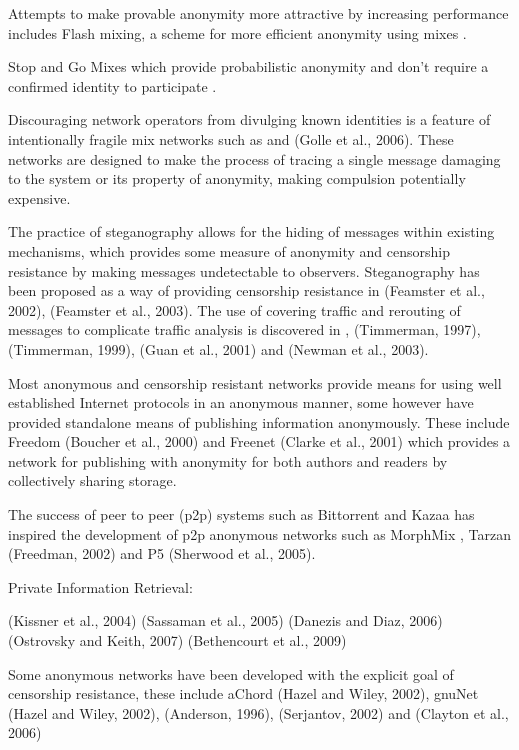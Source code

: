 \documentclass{ecuthesis}
\begin{document}
Attempts to make provable anonymity more attractive by increasing performance includes Flash mixing, a scheme for more efficient anonymity using mixes \citep{Jakobsson:1999p2008}.

Stop and Go Mixes which provide probabilistic anonymity and don’t require a confirmed identity to participate \citep{Kesdogan:1998p2027}.

Discouraging network operators from divulging known identities is a feature of intentionally fragile mix networks such as \citep{Reiter:2004p5868} and (Golle et al., 2006). These networks are designed to make the process of tracing a single message damaging to the system or its property of anonymity, making compulsion potentially expensive.

\cite{Jakobsson:2002p5815} \cite{Goel:2003p5871}

The practice of steganography allows for the hiding of messages within existing mechanisms, which provides some measure of anonymity and censorship resistance by making messages undetectable to observers. Steganography has been proposed as a way of providing censorship resistance in (Feamster et al., 2002), (Feamster et al., 2003). The use of covering traffic and rerouting of messages to complicate traffic analysis is discovered in \citep{Venkatraman:1995p6008}, (Timmerman, 1997), (Timmerman, 1999), (Guan et al., 2001) and (Newman et al., 2003).

Most anonymous and censorship resistant networks provide means for using well established Internet protocols in an anonymous manner, some however have provided standalone means of publishing information anonymously. These include Freedom (Boucher et al., 2000) and Freenet (Clarke et al., 2001) which provides a network for publishing with anonymity for both authors and readers by collectively sharing storage.

The success of peer to peer (p2p) systems such as Bittorrent and Kazaa has inspired the development of p2p anonymous networks such as MorphMix \citep{Rennhard:2002p4559}, Tarzan (Freedman, 2002) and P5 (Sherwood et al., 2005).

Private Information Retrieval:

(Kissner et al., 2004) (Sassaman et al., 2005) (Danezis and Diaz, 2006) (Ostrovsky and Keith, 2007) (Bethencourt et al., 2009)

Some anonymous networks have been developed with the explicit goal of censorship resistance, these include aChord (Hazel and Wiley, 2002), gnuNet (Hazel and Wiley, 2002), (Anderson, 1996), (Serjantov, 2002) and (Clayton et al., 2006)
\end{document}
